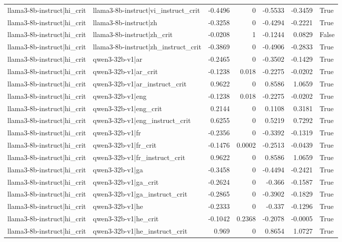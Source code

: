 \begin{table}
\begin{tabular}{l l r r r r l}
llama3-8b-instruct|hi_crit & llama3-8b-instruct|vi_instruct_crit & -0.4496 & 0 & -0.5533 & -0.3459 & True \\
llama3-8b-instruct|hi_crit & llama3-8b-instruct|zh & -0.3258 & 0 & -0.4294 & -0.2221 & True \\
llama3-8b-instruct|hi_crit & llama3-8b-instruct|zh_crit & -0.0208 & 1 & -0.1244 & 0.0829 & False \\
llama3-8b-instruct|hi_crit & llama3-8b-instruct|zh_instruct_crit & -0.3869 & 0 & -0.4906 & -0.2833 & True \\
llama3-8b-instruct|hi_crit & qwen3-32b-v1|ar & -0.2465 & 0 & -0.3502 & -0.1429 & True \\
llama3-8b-instruct|hi_crit & qwen3-32b-v1|ar_crit & -0.1238 & 0.018 & -0.2275 & -0.0202 & True \\
llama3-8b-instruct|hi_crit & qwen3-32b-v1|ar_instruct_crit & 0.9622 & 0 & 0.8586 & 1.0659 & True \\
llama3-8b-instruct|hi_crit & qwen3-32b-v1|eng & -0.1238 & 0.018 & -0.2275 & -0.0202 & True \\
llama3-8b-instruct|hi_crit & qwen3-32b-v1|eng_crit & 0.2144 & 0 & 0.1108 & 0.3181 & True \\
llama3-8b-instruct|hi_crit & qwen3-32b-v1|eng_instruct_crit & 0.6255 & 0 & 0.5219 & 0.7292 & True \\
llama3-8b-instruct|hi_crit & qwen3-32b-v1|fr & -0.2356 & 0 & -0.3392 & -0.1319 & True \\
llama3-8b-instruct|hi_crit & qwen3-32b-v1|fr_crit & -0.1476 & 0.0002 & -0.2513 & -0.0439 & True \\
llama3-8b-instruct|hi_crit & qwen3-32b-v1|fr_instruct_crit & 0.9622 & 0 & 0.8586 & 1.0659 & True \\
llama3-8b-instruct|hi_crit & qwen3-32b-v1|ga & -0.3458 & 0 & -0.4494 & -0.2421 & True \\
llama3-8b-instruct|hi_crit & qwen3-32b-v1|ga_crit & -0.2624 & 0 & -0.366 & -0.1587 & True \\
llama3-8b-instruct|hi_crit & qwen3-32b-v1|ga_instruct_crit & -0.2865 & 0 & -0.3902 & -0.1829 & True \\
llama3-8b-instruct|hi_crit & qwen3-32b-v1|he & -0.2333 & 0 & -0.337 & -0.1296 & True \\
llama3-8b-instruct|hi_crit & qwen3-32b-v1|he_crit & -0.1042 & 0.2368 & -0.2078 & -0.0005 & True \\
llama3-8b-instruct|hi_crit & qwen3-32b-v1|he_instruct_crit & 0.969 & 0 & 0.8654 & 1.0727 & True \\

\end{tabular}
\end{table}
